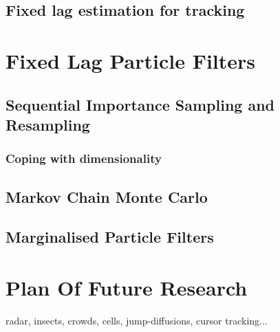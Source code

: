 \documentclass{RJWThesis}
\begin{document}
\section{Fixed lag estimation for tracking}


\chapter{Fixed Lag Particle Filters}
\section{Sequential Importance Sampling and Resampling}
\subsection{Coping with dimensionality}
\section{Markov Chain Monte Carlo}
\section{Marginalised Particle Filters}

\chapter{Plan Of Future Research}
radar, insects, crowds, cells, jump-diffusions, cursor tracking...



\end{document}
